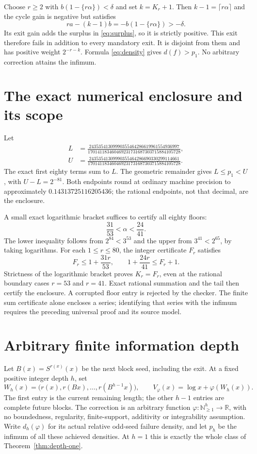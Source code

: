 \documentclass[11pt,letterpaper]{article}
\newcommand{\NN}{\mathbb{N}}
\newcommand{\RR}{\mathbb{R}}
\begin{document}
Choose $r\ge2$ with $b(1-\{r\alpha\})<\delta$ and set $k=K_r+1$. Then
$k-1=\lceil r\alpha\rceil$ and the cycle gain is negative but satisfies
\[
 ra-(k-1)b=-b(1-\{r\alpha\})>-\delta.
\]
Its exit gain adds the surplus in \eqref{eq:surplus}, so it is strictly
positive. This exit therefore fails in addition to every mandatory exit.
It is disjoint from them and has positive weight $2^{-r-k}$. Formula
\eqref{eq:density} gives $d(f)>p_1$. No arbitrary correction attains the infimum.

\section{The exact numerical enclosure and its scope}
Let
\begin{align*}
 L&=\frac{24353541309990355464286619961554936997}
 {170141183460469231731687303715884105728},\\[0.3em]
 U&=\frac{24353541309990355464286690330299114661}
 {170141183460469231731687303715884105728}.
\end{align*}
The exact first eighty terms sum to $L$. The geometric remainder gives
$L\le p_1<U$, with $U-L=2^{-81}$. Both endpoints round at ordinary machine
precision to approximately $0.14313725116205436$; the rational endpoints,
not that decimal, are the enclosure.

A small exact logarithmic bracket suffices to certify all eighty floors:
\[
 \frac{31}{53}<\alpha<\frac{24}{41}.
\]
The lower inequality follows from $2^{84}<3^{53}$ and the upper from
$3^{41}<2^{65}$, by taking logarithms. For each $1\le r\le80$, the integer
certificate $F_r$ satisfies
\[
 F_r\le1+\frac{31r}{53},\qquad
 1+\frac{24r}{41}\le F_r+1.
\]
Strictness of the logarithmic bracket proves $K_r=F_r$, even at the rational
boundary cases $r=53$ and $r=41$. Exact rational summation and the tail then
certify the enclosure. A corrupted floor entry is rejected by the checker.
The finite sum certificate alone encloses a series; identifying that series
with the infimum requires the preceding universal proof and its source model.


\section{Arbitrary finite information depth}\label{sec:general-depth}
Let $B(x)=S^{r(x)}(x)$ be the next block seed, including the exit. At a fixed
positive integer depth $h$, set
\[
 W_h(x)=\bigl(r(x),r(Bx),\ldots,r(B^{h-1}x)\bigr),\qquad
 V_\varphi(x)=\log x+\varphi(W_h(x)).
\]
The first entry is the current remaining length; the other $h-1$ entries are
complete future blocks. The correction is an arbitrary function
$\varphi:\NN_{\ge1}^{h}\to\RR$, with no boundedness, regularity, finite-support,
additivity or integrability assumption. Write $d_h(\varphi)$ for its actual
relative odd-seed failure density, and let $p_h$ be the infimum of all these
achieved densities. At $h=1$ this is exactly the whole class of
Theorem~\ref{thm:depth-one}.
\end{document}
